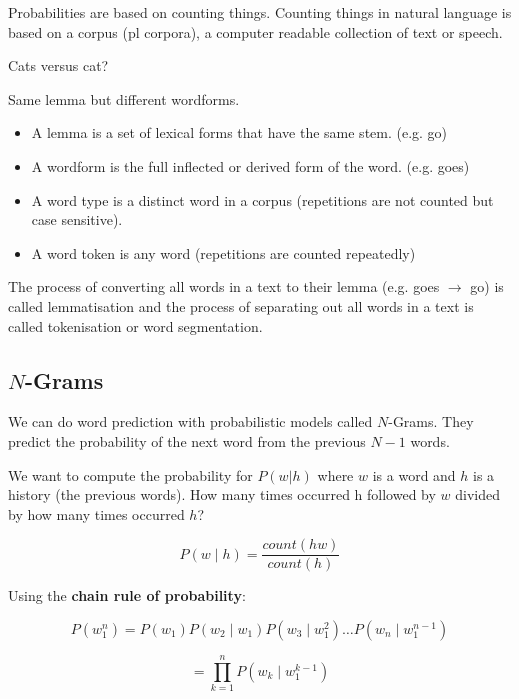 Probabilities are based on counting things. Counting things in natural language is based on a corpus (pl corpora), a computer readable collection of text or speech.

Cats versus cat?

Same lemma but different wordforms.

\begin{itemize}
\item A lemma is a set of lexical forms that have the same stem. (e.g. go)
\item A wordform is the full inflected or derived form of the word. (e.g. goes)
\item A word type is a distinct word in a corpus (repetitions are not counted but case sensitive).
\item A word token is any word (repetitions are counted repeatedly)
\end{itemize}

The process of converting all words in a text to their lemma (e.g. goes $\to$ go) is called lemmatisation and the process of separating out all words in a text is called tokenisation or word segmentation.

\subsection{$N$-Grams}

We can do word prediction with probabilistic models called $N$-Grams. They predict the probability of the next word from the previous $N-1$ words.

We want to compute the probability for $P\left(w|h\right)$ where $w$ is a word and $h$ is a history (the previous words). How many times occurred h followed by $w$ divided by how many times occurred $h$?

\begin{equation}
P\left(w \mid h\right) = \frac{count\left(hw\right)}{count\left(h\right)}
\end{equation}

Using the \textbf{chain rule of probability}:

\begin{equation}
P\left(w_1^n\right) = P\left(w_1\right)P\left(w_2 \mid w_1\right)P\left(w_3 \mid w_1^2 \right) \ldots P\left(w_n \mid w_1^{n-1}\right)
\end{equation}

\begin{equation}
= \prod_{k=1}^{n}P\left(w_k \mid w_1^{k-1}\right)
\end{equation}

